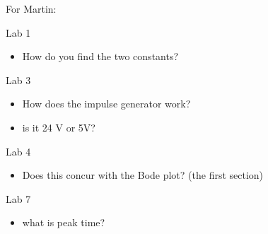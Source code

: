 \documentclass{report}
\begin{document}
For Martin:

Lab 1
\begin{itemize}
\item How do you find the two constants?
\end{itemize}

Lab 3
\begin{itemize}
\item How does the impulse generator work? \item is it 24 V or 5V?
\end{itemize}

Lab 4

\begin{itemize}
\item Does this concur with the Bode plot?  (the first section)
\end{itemize}

Lab 7

\begin{itemize}
\item what is peak time?

\end{itemize}
\end{document}
